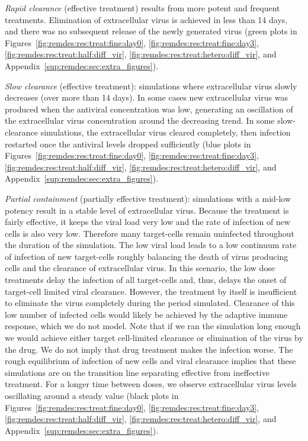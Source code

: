 \emph{Rapid clearance} (effective treatment) results from more potent and frequent treatments. Elimination of extracellular virus is achieved in less than 14 days, and there was no subsequent release of the newly generated virus (green plots in Figures~\ref{fig:remdes:res:treat:fine:day0}, \ref{fig:remdes:res:treat:fine:day3}, \ref{fig:remdes:res:treat:half:diff_vir}, \ref{fig:remdes:res:treat:hetero:diff_vir}, and Appendix~\ref{sup:remdes:sec:extra_figures}).

\emph{Slow clearance} (effective treatment): simulations where extracellular virus slowly decreases (over more than 14 days). In some cases new extracellular virus was produced when the antiviral concentration was low, generating an oscillation of the extracellular virus concentration around the decreasing trend. In some slow-clearance simulations, the extracellular virus cleared completely, then infection restarted once the antiviral levels dropped sufficiently (blue plots in Figures~\ref{fig:remdes:res:treat:fine:day0}, \ref{fig:remdes:res:treat:fine:day3}, \ref{fig:remdes:res:treat:half:diff_vir}, \ref{fig:remdes:res:treat:hetero:diff_vir}, and Appendix~\ref{sup:remdes:sec:extra_figures}).

\emph{Partial containment} (partially effective treatment): simulations with a mid-low potency result in a stable level of extracellular virus. Because the treatment is fairly effective, it keeps the viral load very low and the rate of infection of new cells is also very low. Therefore many target-cells remain uninfected throughout the duration of the simulation. The low viral load leads to a low continuum rate of infection of new target-cells roughly balancing the death of virus producing cells and the clearance of extracellular virus. In this scenario, the low dose treatments delay the infection of all target-cells and, thus, delays the onset of target-cell limited viral clearance. However, the treatment by itself is insufficient to eliminate the virus completely during the period simulated. Clearance of this low number of infected cells would likely be achieved by the adaptive immune response, which we do not model. Note that if we ran the simulation long enough we would achieve either target cell-limited clearance or elimination of the virus by the drug. We do not imply that drug treatment makes the infection worse. The rough equilibrium of infection of new cells and viral clearance implies that these simulations are on the transition line separating effective from ineffective treatment. For a longer time between doses, we observe extracellular virus levels oscillating around a steady value (black plots in Figures~\ref{fig:remdes:res:treat:fine:day0}, \ref{fig:remdes:res:treat:fine:day3}, \ref{fig:remdes:res:treat:half:diff_vir}, \ref{fig:remdes:res:treat:hetero:diff_vir}, and Appendix~\ref{sup:remdes:sec:extra_figures}).

